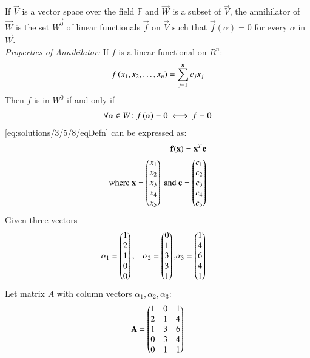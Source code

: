  If $\vec{V}$ is a vector space over the field $\mathbb{F}$ and $\vec{W}$ is a subset of $\vec{V}$, the annihilator of $\vec{W}$ is the set $\vec{W^0}$ of linear functionals $\vec{f}$ on $\vec{V}$ such that $\vec{f}(\alpha)=0$ for every $\alpha$ in $\vec{W}$.
\\
{\em Properties of Annihilator: }
If $f$ is a linear functional on $R^n$:
\begin{align}
    f\left(x_1,x_2,\dots,x_n\right)=\sum_{j=1}^{n}c_j x_j\label{eq:solutions/3/5/8/eqDefn}
\end{align}
Then $f$ is in $W^0$ if and only if 
\begin{align}
    \forall \alpha \in W\colon f\left(\alpha\right)=0 \iff f=0
\end{align}
\eqref{eq:solutions/3/5/8/eqDefn} can be expressed as:
\begin{align}
    \vec{f(x)}=\vec{x}^T\vec{c}\\
    \text{where  } \Vec{x}=\myvec{x_1\\x_2\\x_3\\x_4\\x_5} \text{ and } \vec{c}=\myvec{c_1\\c_2\\c_3\\c_4\\c_5}
\end{align}
Given three vectors
\begin{multline}
    \begin{aligned}
    &\alpha_1=\begin{pmatrix}1\\2\\1\\0\\0\end{pmatrix}, &\alpha_2=\begin{pmatrix}0\\1\\3\\3\\1\end{pmatrix},
    &\alpha_3=\begin{pmatrix}1\\4\\6\\4\\1\end{pmatrix}
    \end{aligned}
    \end{multline}
Let matrix $A$ with column vectors $\alpha_1,\alpha_2,\alpha_3$:
\begin{align}
    \Vec{A}=\myvec{1&0&1\\2&1&4\\1&3&6\\0&3&4\\0&1&1}\label{eq:solutions/3/5/8/eqA}
\end{align}
